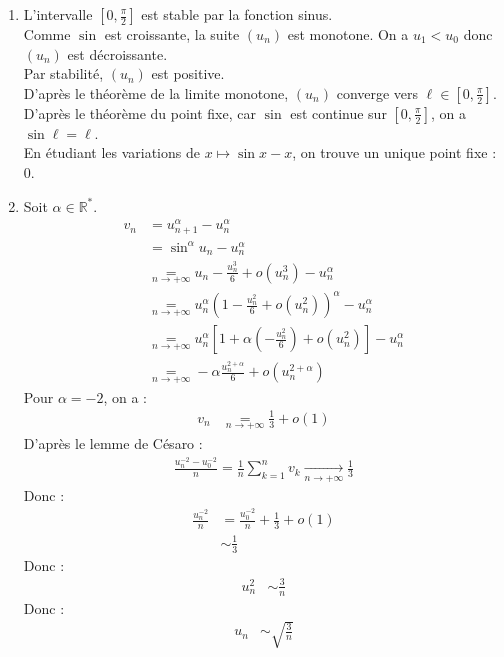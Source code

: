 \documentclass[../main.tex]{subfiles}
\begin{document}
\begin{enumerate}
    \item L'intervalle $[0, \frac{\pi}{2}]$ est stable par la fonction sinus. \\
    Comme $\sin$ est croissante, la suite $(u_n)$ est monotone. On a $u_1 < u_0$ donc $(u_n)$ est décroissante. \\
    Par stabilité, $(u_n)$ est positive. \\
    D'après le théorème de la limite monotone, $(u_n)$ converge vers $\ell \in [0, \frac{\pi}{2}]$. \\
    D'après le théorème du point fixe, car $\sin$ est continue sur $[0, \frac{\pi}{2}]$, on a $\sin \ell = \ell$. \\
    En étudiant les variations de $x\mapsto \sin x - x$, on trouve un unique point fixe : $0$. 

    \item Soit $\alpha \in \mathbb{R}^*$. 
    \begin{align*}
        v_n &= u_{n+1}^\alpha - u_n^\alpha \\
        &= \sin^\alpha u_n - u_n^\alpha \\
        &\underset{n\to +\infty}{=} u_n - \frac{u_n^3}{6} + o(u_n^3) - u_n^\alpha \\
        &\underset{n\to +\infty}{=} u_n^\alpha \left(1 - \frac{u_n^2}{6} + o(u_n^2)\right)^\alpha - u_n^\alpha \\
        &\underset{n\to +\infty}{=} u_n^\alpha \left[1 + \alpha \left(-\frac{u_n^2}{6}\right) + o(u_n^2)\right] - u_n^\alpha \\
        &\underset{n\to +\infty}{=} -\alpha \frac{u_n^{2 + \alpha}}{6} + o(u_n^{2 + \alpha})
    \end{align*}
    Pour $\alpha = -2$, on a : 
    \begin{align*}
        v_n &\underset{n\to +\infty}{=} \frac{1}{3} + o(1)
    \end{align*}
    D'après le lemme de Césaro : 
    \begin{align*}
        \frac{u_n^{-2} - u_0^{-2}}{n} = \frac{1}{n} \sum_{k=1}^{n} v_k \underset{n \to +\infty}{\longrightarrow} \frac{1}{3}
    \end{align*}
    Donc :
    \begin{align*}
        \frac{u_n^{-2}}{n} &= \frac{u_0^{-2}}{n} + \frac{1}{3} + o(1) \\
        &\sim \frac{1}{3}
    \end{align*}
    Donc : 
    \begin{align*}
        u_n^2 &\sim \frac{3}{n}
    \end{align*}
    Donc : 
    \begin{align*}
        u_n &\sim \sqrt{\frac{3}{n}}
    \end{align*}
\end{enumerate}
\end{document}
